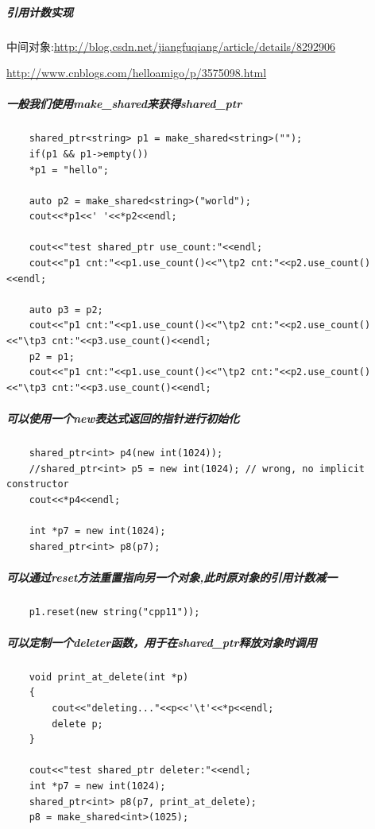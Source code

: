 \documentclass[UTF8,a4paper,12pt]{ctexbook} %
\begin{document}
				\subparagraph{引用计数实现}
					中间对象:\url{http://blog.csdn.net/jiangfuqiang/article/details/8292906}
					
					\url{http://www.cnblogs.com/helloamigo/p/3575098.html}	
				\subparagraph{一般我们使用make\_shared来获得shared\_ptr}
				\begin{lstlisting}
	shared_ptr<string> p1 = make_shared<string>("");
	if(p1 && p1->empty())
	*p1 = "hello";
	
	auto p2 = make_shared<string>("world");
	cout<<*p1<<' '<<*p2<<endl;
	
	cout<<"test shared_ptr use_count:"<<endl;
	cout<<"p1 cnt:"<<p1.use_count()<<"\tp2 cnt:"<<p2.use_count()<<endl;
	
	auto p3 = p2;
	cout<<"p1 cnt:"<<p1.use_count()<<"\tp2 cnt:"<<p2.use_count()<<"\tp3 cnt:"<<p3.use_count()<<endl;
	p2 = p1;
	cout<<"p1 cnt:"<<p1.use_count()<<"\tp2 cnt:"<<p2.use_count()<<"\tp3 cnt:"<<p3.use_count()<<endl;
				\end{lstlisting}				
			
			\subparagraph{可以使用一个new表达式返回的指针进行初始化}
				\begin{lstlisting}
	shared_ptr<int> p4(new int(1024));
	//shared_ptr<int> p5 = new int(1024); // wrong, no implicit constructor
	cout<<*p4<<endl;	
	
	int *p7 = new int(1024);
	shared_ptr<int> p8(p7);
				\end{lstlisting}
			
			\subparagraph{可以通过reset方法重置指向另一个对象,此时原对象的引用计数减一}
				\begin{lstlisting}
	p1.reset(new string("cpp11"));
				\end{lstlisting}
			
			\subparagraph{可以定制一个deleter函数，用于在shared\_ptr释放对象时调用}
				\begin{lstlisting}
	void print_at_delete(int *p)
	{
		cout<<"deleting..."<<p<<'\t'<<*p<<endl;
		delete p;
	}
	
	cout<<"test shared_ptr deleter:"<<endl;
	int *p7 = new int(1024);
	shared_ptr<int> p8(p7, print_at_delete);
	p8 = make_shared<int>(1025);
				\end{lstlisting}
\end{document}
